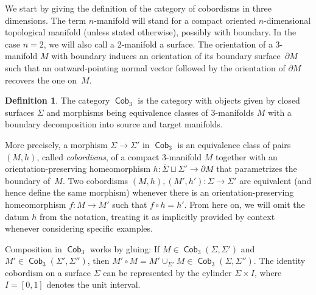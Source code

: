 \documentclass[10pt,a4paper]{amsart}
\DeclareMathOperator{\Cob}{\mathsf{Cob}}
\numberwithin{equation}{section}
\theoremstyle{definition}
\newtheorem{Definition}[Definition]{Definition}
\begin{document}
We start by giving the definition of the category of cobordisms in three dimensions. The term $n$-manifold will stand for a compact oriented $n$-dimensional topological manifold (unless stated otherwise), possibly with boundary.
In the case $n = 2$, we will also call a 2-manifold a surface. The orientation of a 3-manifold $M$ with boundary induces an orientation of its boundary surface~$\partial M$ such that an outward-pointing normal vector followed by the orientation of $\partial M$ recovers the one on~$M$.
\begin{Definition}\label{defCob}
The category $\Cob_3$ is the category with objects given by closed surfaces $\Sigma$ and morphisms being equivalence classes of 3-manifolds $M$ with a boundary decomposition into source and target manifolds.

More precisely, a morphism $\Sigma \rightarrow \Sigma'$ in $\Cob_3$ is an equivalence class of pairs $(M, h)$, called \textit{cobordisms}, of a compact 3-manifold $M$ together with an orientation-preserving homeomorphism $h\colon \overline{\Sigma} \sqcup \Sigma'\! \rightarrow \partial M$ that parametrizes the boundary of~$M$. Two cobordisms $(M,h), (M',h')\colon {\Sigma \rightarrow \Sigma'}$ are equivalent (and hence define the same morphism) whenever there is an orientation-preserving homeomorphism $f\colon M \rightarrow M'$ such that $f \circ h = h'$. From here on, we will omit the datum $h$ from the notation, treating it as implicitly provided by context whenever considering specific examples.

 Composition in $\Cob_3$ works by gluing: If $M \in \Cob_3(\Sigma, \Sigma')$ and $M' \in \Cob_3(\Sigma', \Sigma'')$, then $M' \circ M = M' \cup_{\Sigma'} M \in \Cob_3(\Sigma, \Sigma'')$. The identity cobordism on a surface $\Sigma$ can be represented by the cylinder $\Sigma \times I$, where $I = [0,1]$ denotes the unit interval.
\end{Definition}
\end{document}
